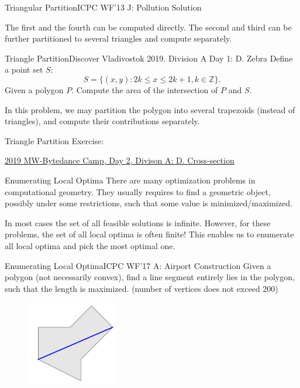 \documentclass{beamer}
\begin{document}
\begin{frame}{Triangular Partition}{ICPC WF'13 J: Pollution Solution}
\begin{figure}

\end{figure}

\pause

The first and the fourth can be computed directly. The second and third can be further partitioned to several triangles and compute separately.
\end{frame}

\begin{frame}{Triangle Partition}{Discover Vladivostok 2019. Division A Day 1: D. Zebra}
Define a point set $S$:
$$ S = \{(x, y): 2k \leq x \leq 2k + 1, k \in \mathbb{Z}\}. $$
Given a polygon $P$. Compute the area of the intersection of $P$ and $S$.

\pause

In this problem, we may partition the polygon into several trapezoids (instead of triangles), and compute their contributions separately.
\end{frame}

\begin{frame}[fragile]{Triangle Partition}
Exercise:

 \href{https://github.com/wcysai/Calabash/blob/master/ByteDance%20-%20Moscow%20Workshops%20ICPC%20Programming%20Camp%202019.%20Day%202%2C%20Div%20A./statements.pdf}{2019 MW-Bytedance Camp, Day 2, Divison A: D. Cross-section}
\end{frame}

\begin{frame}{Enumerating Local Optima}
There are many optimization problems in computational geometry. They usually requires to find a geometric object, possibly under some restrictions, such that some value is minimized/maximized.

In most cases the set of all feasible solutions is infinite. However, for these problems, the set of all local optima is often finite! This enables us to enumerate all local optima and pick the most optimal one.
\end{frame}

\begin{frame}{Enumerating Local Optima}{ICPC WF'17 A: Airport Construction}
Given a polygon (not necessarily convex), find a line segment entirely lies in the polygon, such that the length is maximized. (number of vertices does not exceed 200)

\begin{figure}
	\centering
	\includegraphics[width=4cm]{icpc17a.png}
\end{figure}
\end{frame}
\end{document}
